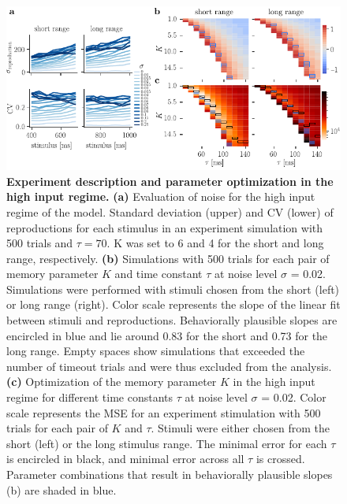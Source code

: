 \documentclass[10pt, a4paper]{article}
\begin{document}
\begin{figure}[!htb]
	\centering
	\includegraphics{figures/supp_highI.pdf}
	\caption{\textbf{Experiment description and parameter optimization in the high input regime.} 
	\textbf{(a)} Evaluation of noise for the high input regime of the model. Standard deviation (upper) and CV (lower) of reproductions for each stimulus in an experiment simulation with 500 trials and $\tau = 70$. K was set to 6 and 4 for the short and long range, respectively.
	\textbf{(b)} Simulations with 500 trials for each pair of memory parameter $K$ and time constant $\tau$ at noise level $\sigma$ = 0.02. Simulations were performed with stimuli chosen from the short (left) or long range (right). Color scale represents the slope of the linear fit between stimuli and reproductions. Behaviorally plausible slopes are encircled in blue and lie around 0.83 for the short and 0.73 for the long range. Empty spaces show simulations that exceeded the number of timeout trials and were thus excluded from the analysis.
	\textbf{(c)} Optimization of the memory parameter $K$ in the high input regime for different time constants $\tau$ at noise level $\sigma$ = 0.02. Color scale represents the MSE for an experiment stimulation with 500 trials for each pair of $K$ and $\tau$. Stimuli were either chosen from the short (left) or the long stimulus range. The minimal error for each $\tau$ is encircled in black, and minimal error across all $\tau$ is crossed. Parameter combinations that result in behaviorally plausible slopes (b) are shaded in blue. 
	}
\label{sup:highI}
\end{figure}
\end{document}
